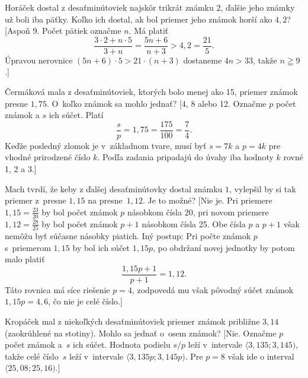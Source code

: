 {Horáček dostal z desaťminútoviek najskôr trikrát
známku $2$, ďalšie jeho známky už boli iba päťky.
Koľko ich dostal, ak bol priemer jeho známok horší ako $4{,}2$?
[Aspoň 9. Počet pätiek označme $n$. Má platiť
$$\frac{3\cdot 2+n\cdot
5}{3+n}=\frac{5n+6}{n+3}>4{,}2=\frac{21}{5}.$$
Úpravou nerovnice $(5n+6)\cdot5>21\cdot(n+3)$ dostaneme
$4n>33$, takže $n\geqq9$.]

Čermáková mala z desaťminútoviek, ktorých bolo menej ako 15,
priemer známok presne $1{,}75$. O~koľko známok sa mohlo jednať?
[4, 8 alebo 12. Označme $p$ počet známok a $s$ ich súčet. Platí
$$
\frac{s}{p}=1{,}75=\frac{175}{100}=\frac{7}{4}.
$$
Keďže posledný zlomok je v~základnom tvare, musí byť $s=7k$ a $p=4k$
pre vhodné prirodzené číslo $k$. Podľa zadania pripadajú do úvahy iba
hodnoty $k$ rovné 1, 2 a 3.]

Mach tvrdí, že keby z ďalšej desaťminútovky dostal
známku $1$, vylepšil by si tak priemer z~presne $1{,}15$ na
presne~$1{,}12$. Je to možné?
[Nie je. Pri priemere $1{,}15=\frac{23}{20}$ by bol
počet známok $p$ násobkom čísla 20, pri novom priemere
$1{,}12=\frac{28}{25}$ by bol počet známok $p+1$ násobkom čísla
25. Obe čísla $p$ a $p+1$ však nemôžu byť súčasne násobky
piatich. Iný postup: Pri počte známok $p$ s~priemerom $1{,}15$ by
bol ich súčet $1{,}15p$, po obdržaní novej jednotky by potom
malo platiť
$$
\frac{1{,}15p+1}{p+1}=1{,}12.
$$
Táto rovnica má síce riešenie $p=4$, zodpovedá mu však
pôvodný súčet známok $1{,}15p=4{,}6$, čo nie je celé číslo.]

\D
Kropáček mal z niekoľkých desaťminútoviek priemer známok približne
$3{,}14$ (zaokrúhlené na stotiny). Mohlo sa jednať o~osem známok?
[Nie. Označme $p$ počet známok a~$s$ ich súčet. Hodnota podielu
$s/p$ leží v~intervale $\langle3{,}135;3{,}145)$, takže celé číslo~$s$ leží
v~intervale $\langle3{,}135p;3{,}145p)$. Pre $p=8$ však
ide o interval $\langle25{,}08;25{,}16)$.]
}


